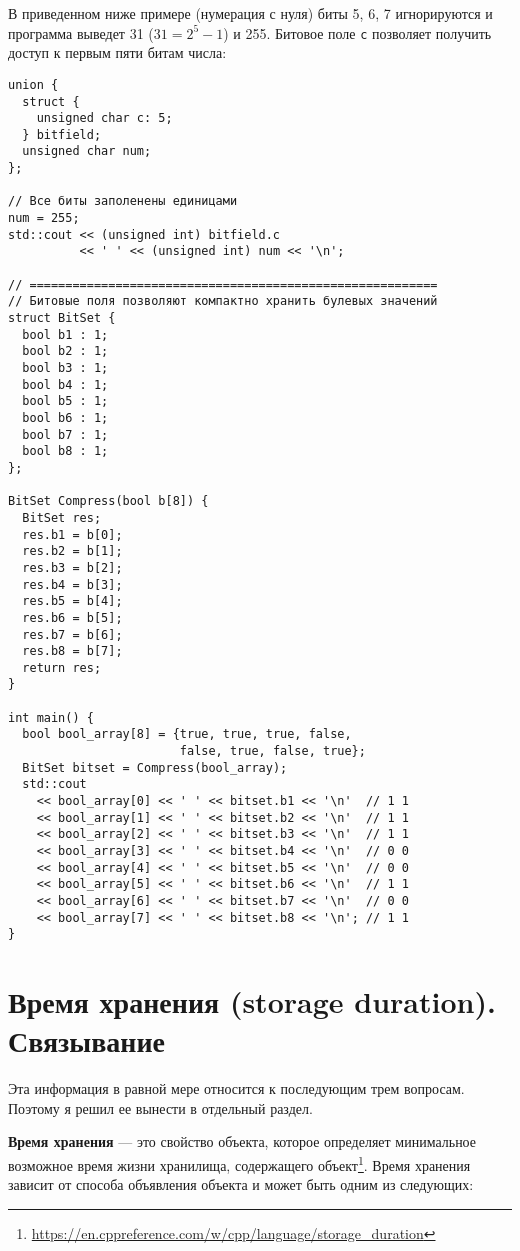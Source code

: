 В приведенном ниже примере (нумерация с нуля) биты 5, 6, 7 игнорируются и программа
выведет 31 ($31 = 2^5 - 1$) и 255. Битовое поле \verb|c| позволяет получить доступ к первым пяти битам числа:
\begin{verbatim}
union {
  struct {
    unsigned char c: 5;
  } bitfield;
  unsigned char num;
};

// Все биты заполенены единицами
num = 255;
std::cout << (unsigned int) bitfield.c
          << ' ' << (unsigned int) num << '\n';

// =========================================================
// Битовые поля позволяют компактно хранить булевых значений
struct BitSet {
  bool b1 : 1;
  bool b2 : 1;
  bool b3 : 1;
  bool b4 : 1;
  bool b5 : 1;
  bool b6 : 1;
  bool b7 : 1;
  bool b8 : 1;
};

BitSet Compress(bool b[8]) {
  BitSet res;
  res.b1 = b[0];
  res.b2 = b[1];
  res.b3 = b[2];
  res.b4 = b[3];
  res.b5 = b[4];
  res.b6 = b[5];
  res.b7 = b[6];
  res.b8 = b[7];
  return res;
}
  
int main() {
  bool bool_array[8] = {true, true, true, false,
                        false, true, false, true};
  BitSet bitset = Compress(bool_array);
  std::cout
    << bool_array[0] << ' ' << bitset.b1 << '\n'  // 1 1
    << bool_array[1] << ' ' << bitset.b2 << '\n'  // 1 1
    << bool_array[2] << ' ' << bitset.b3 << '\n'  // 1 1
    << bool_array[3] << ' ' << bitset.b4 << '\n'  // 0 0
    << bool_array[4] << ' ' << bitset.b5 << '\n'  // 0 0
    << bool_array[5] << ' ' << bitset.b6 << '\n'  // 1 1
    << bool_array[6] << ' ' << bitset.b7 << '\n'  // 0 0
    << bool_array[7] << ' ' << bitset.b8 << '\n'; // 1 1
}
\end{verbatim}

\section*{Время хранения (storage duration). Связывание}
Эта информация в равной мере относится к последующим трем вопросам. Поэтому я решил ее
вынести в отдельный раздел.

\textbf{Время хранения} --- это свойство объекта, которое определяет минимальное
возможное время жизни хранилища, содержащего объект\footnote{\url{https://en.cppreference.com/w/cpp/language/storage_duration}}.
Время хранения зависит от способа объявления объекта и может быть одним из следующих:

